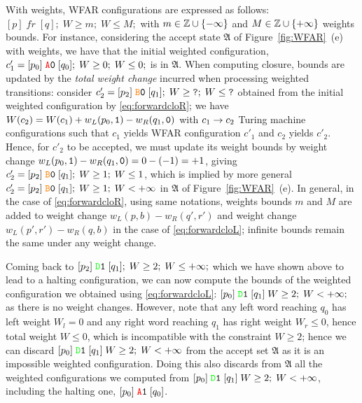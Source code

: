 With weights, WFAR configurations are expressed as follows: $[p] \; fr \; [q];\; W \geq m; \; W \leq M;$ with $m \in \mathbb{Z} \cup\{-\infty\}$ and $M \in \mathbb{Z} \cup \{+\infty\}$ weights bounds. For instance, considering the accept state $\mathfrak{A}$ of Figure~\ref{fig:WFAR}~(e) with weights, we have that the initial weighted configuration, $c'_1 = [p_0] \; \texttt{\stateA}\szero \; [q_0];\; W \geq 0;\; W \leq 0;$ is in $\mathfrak{A}$. When computing closure, bounds are updated by the \textit{total weight change} incurred when processing weighted transitions: consider $c'_2 = [p_2] \; \texttt{\stateB}\szero \; [q_1];\; W \geq \texttt{?};\; W \leq \texttt{?}$ obtained from the initial weighted configuration by \eqref{eq:forwardcloR}; we have $W(c_2) = W(c_1) + w_L(p_0,\texttt{1}) - w_R(q_1, \texttt{0})$ with $c_1 \to c_2$ Turing machine configurations such that $c_1$ yields WFAR configuration $c'_1$ and $c_2$ yields $c'_2$. Hence, for $c'_2$ to be accepted, we must update its weight bounds by weight change $w_L(p_0,\texttt{1}) - w_R(q_1, \texttt{0}) = 0 - (- 1) = +1$, giving $c'_2 = [p_2] \; \texttt{\stateB}\szero \; [q_1];\; W \geq 1;\; W \leq 1$, which is implied by more general $c'_2 = [p_2] \; \texttt{\stateB}\szero \; [q_1];\; W \geq 1;\; W < +\infty$ in $\mathfrak{A}$ of Figure~\ref{fig:WFAR}~(e). In general, in the case of \eqref{eq:forwardcloR}, using same notations, weights bounds $m$ and $M$ are added to weight change $w_L(p,b) - w_R(q', r')$ and weight change $w_L(p',r') - w_R(q,b)$ in the case of \eqref{eq:forwardcloL}; infinite bounds remain the same under any weight change.

Coming back to $[p_2] \; \texttt{\stateD}\sone \; [q_1];\; W \geq 2;\; W \leq + \infty;$ which we have shown above to lead to a halting configuration, we can now compute the bounds of the weighted configuration we obtained using \eqref{eq:forwardcloL}: $[p_0] \; \texttt{\stateD}\sone \; [q_1]\; W \geq 2; \; W < +\infty;$ as there is no weight changes. However, note that any left word reaching $q_0$ has left weight $W_l = 0$ and any right word reaching $q_1$ has right weight $W_r \leq 0$, hence total weight $W \leq 0$, which is incompatible with the constraint $W \geq 2$; hence we can discard $[p_0] \; \texttt{\stateD}\sone \; [q_1]\; W \geq 2; \; W < +\infty$ from the accept set $\mathfrak{A}$ as it is an impossible weighted configuration. Doing this also discards from $\mathfrak{A}$ all the weighted configurations we computed from $[p_0] \; \texttt{\stateD}\sone \; [q_1]\; W \geq 2; \; W < +\infty$, including the halting one, $[p_0] \; \texttt{\stateA}\sone \; [q_0] $.


